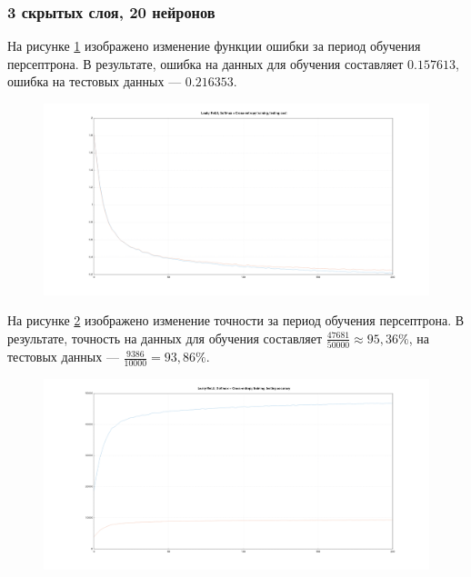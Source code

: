 \documentclass[a4paper, 14pt]{extarticle}
\begin{document}
\subsubsection{3 скрытых слоя, 20 нейронов}


На рисунке \ref{fig:3_20_leaky_relu_softmax_cross_entropy_cost} изображено изменение функции ошибки за период обучения персептрона.
В результате, ошибка на данных для обучения составляет $0.157613$, ошибка на тестовых данных --- $0.216353$.

\begin{figure}[!htb]
  \centering\includegraphics[width=\textwidth]{images/3_20_leaky_relu_softmax_cross_entropy_cost.png}
  \caption{}
  \label{fig:3_20_leaky_relu_softmax_cross_entropy_cost}
\end{figure}

На рисунке \ref{fig:3_20_leaky_relu_softmax_cross_entropy_accuracy} изображено изменение точности за период обучения персептрона.
В результате, точность на данных для обучения составляет $\frac{47681}{50000} \approx 95,36\%$, на тестовых данных --- $\frac{9386}{10000} = 93,86\%$.

\begin{figure}[!htb]
  \centering\includegraphics[width=\textwidth]{images/3_20_leaky_relu_softmax_cross_entropy_accuracy.png}
  \caption{}
  \label{fig:3_20_leaky_relu_softmax_cross_entropy_accuracy}
\end{figure}
\end{document}
